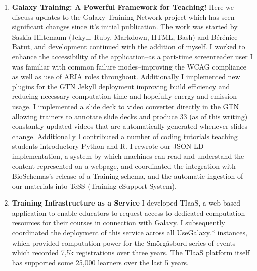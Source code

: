 \begin{enumerate}[label=\ref{chapter:training}.\arabic*]
\itemsep-0.5em
\setcounter{enumi}{-1}

\item \textbf{Galaxy Training: A Powerful Framework for Teaching!} Here we discuss updates to the Galaxy Training Network project which has seen significant changes since it's initial publication. The work was started by Saskia Hiltemann (Jekyll, Ruby, Markdown, HTML, Bash) and Bérénice Batut, and development continued with the addition of myself. I worked to enhance the accessibility of the application--as a part-time screenreader user I was familiar with common failure modes--improving the WCAG compliance as well as use of ARIA roles throughout. Additionally I implemented new plugins for the GTN Jekyll deployment improving build efficiency and reducing necessary computation time and hopefully energy and emission usage. I implemented a slide deck to video converter directly in the GTN allowing trainers to annotate slide decks and produce 33 (as of this writing) constantly updated videos that are automatically generated whenever slides change. Additionally I contributed a number of coding tutorials teaching students introductory Python and R. I rewrote our JSON-LD implementation, a system by which machines can read and understand the content represented on a webpage, and coordinated the integration with BioSchemas's release of a Training schema, and the automatic ingestion of our materials into TeSS (Training eSupport System).

\item \textbf{Training Infrastructure as a Service} I developed TIaaS, a web-based application to enable educators to request access to dedicated computation resources for their courses in connection with Galaxy. I subsequently coordinated the deployment of this service across all UseGalaxy.* instances, which provided computation power for the Smörgåsbord series of events which recorded 7,5k registrations over three years. The TIaaS platform itself has supported some 25,000 learners over the last 5 years.


\end{enumerate}


